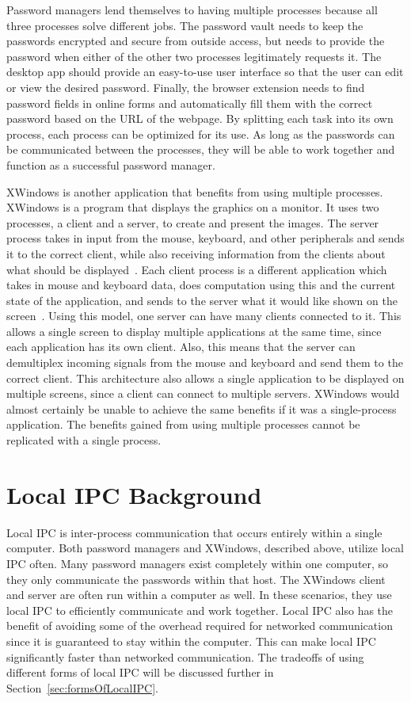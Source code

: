 Password managers lend themselves to having multiple processes because all three processes solve different jobs.  The password vault needs to keep the passwords encrypted and secure from outside access, but needs to provide the password when either of the other two processes legitimately requests it.  The desktop app should provide an easy-to-use user interface so that the user can edit or view the desired password.  Finally, the browser extension needs to find password fields in online forms and automatically fill them with the correct password based on the URL of the webpage.  By splitting each task into its own process, each process can be optimized for its use.  As long as the passwords can be communicated between the processes, they will be able to work together and function as a successful password manager.

XWindows is another application that benefits from using multiple processes.  XWindows is a program that displays the graphics on a monitor.  It uses two processes, a client and a server, to create and present the images.  The server process takes in input from the mouse, keyboard, and other peripherals and sends it to the correct client, while also receiving information from the clients about what should be displayed~\cite{Scheifler:1986:XWS:22949.24053}.  Each client process is a different application which takes in mouse and keyboard data, does computation using this and the current state of the application, and sends to the server what it would like shown on the screen~\cite{Scheifler:1986:XWS:22949.24053}.  Using this model, one server can have many clients connected to it.  This allows a single screen to display multiple applications at the same time, since each application has its own client.  Also, this means that the server can demultiplex incoming signals from the mouse and keyboard and send them to the correct client.  This architecture also allows a single application to be displayed on multiple screens, since a client can connect to multiple servers.  XWindows would almost certainly be unable to achieve the same benefits if it was a single-process application.  The benefits gained from using multiple processes cannot be replicated with a single process.

\section{Local IPC Background}
\label{sec:localIPCBackground}
Local IPC is inter-process communication that occurs entirely within a single computer.  Both password managers and XWindows, described above, utilize local IPC often.  Many password managers exist completely within one computer, so they only communicate the passwords within that host.  The XWindows client and server are often run within a computer as well.  In these scenarios, they use local IPC to efficiently communicate and work together.  Local IPC also has the benefit of avoiding some of the overhead required for networked communication since it is guaranteed to stay within the computer.  This can make local IPC significantly faster than networked communication.  The tradeoffs of using different forms of local IPC will be discussed further in Section~\ref{sec:formsOfLocalIPC}.


